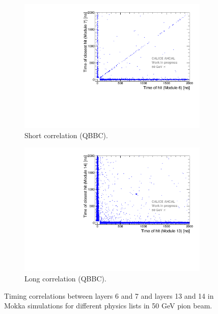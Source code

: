 \begin{figure}[htbp!]
\begin{subfigure}[t]{0.5\textwidth}
		\includegraphics[width=1\textwidth]{chap5/fig_AHCAL_timing/Pions/ComparisonToSim/Time_Correlation_50GeV_short_QBBC.pdf}
		\caption{Short correlation (QBBC).} \label{fig:Corr_short_QBBC}
	\end{subfigure}
	\hfill
	\begin{subfigure}[t]{0.5\textwidth}
		\centering
		\includegraphics[width=1\textwidth]{chap5/fig_AHCAL_timing/Pions/ComparisonToSim/Time_Correlation_50GeV_long_QBBC.pdf}
		\caption{Long correlation (QBBC).} \label{fig:Corr_long_QBBC}
	\end{subfigure}
	\caption{Timing correlations between layers 6 and 7 and layers 13 and 14 in Mokka simulations for different physics lists in 50 GeV pion beam.}
	\label{fig:Corr_Mokka_Simulation}
\end{figure}

